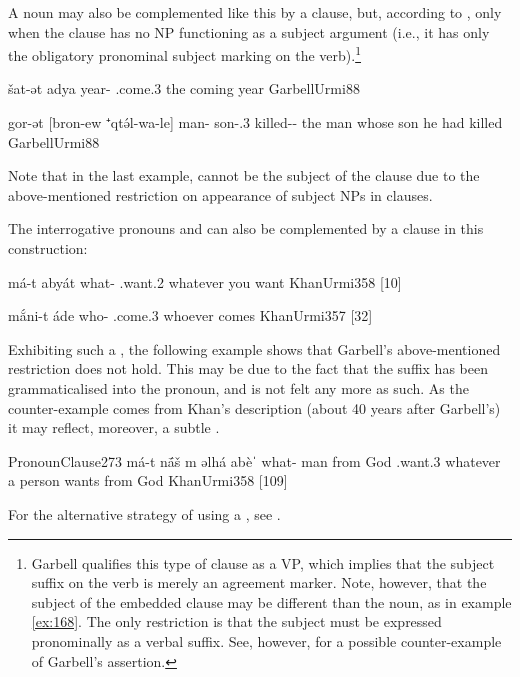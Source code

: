 A noun may also be complemented like this by a clause, but, according to \citet[88]{GarbellUrmi}, only when the clause has no NP functioning as a subject argument (i.e., it has only the obligatory pronominal subject marking on the verb).\footnote{Garbell qualifies this type of clause as a VP, which implies that the subject suffix on the verb is merely an agreement marker. Note, however, that the subject of the embedded clause may be different than the \prim noun, as in example \vref{ex:168}. The only restriction is that the subject must be expressed pronominally as a verbal suffix. See, however,  for a possible counter-example of Garbell's assertion.} 

{šat-ət adya}
{year-\cst{} \sbjv.come.3\fem}
{the coming year}
{GarbellUrmi}{88}

{gor-ət [bron-ew ⁺qtə́l-wa-le]}
{man-\cst{} son-\poss.3\masc{} killed-\pst-\masc}
{the man whose son he had killed}
{GarbellUrmi}{88}

Note that in the last example,  cannot be the subject of the clause due to the above-mentioned restriction on appearance of subject NPs in \secn clauses.

The interrogative pronouns  and  can also be complemented by a clause in this construction:

{má-t abyát}
{what-\cst{} \sbjv.want.2\fem}
{whatever you want}
{KhanUrmi}{358 {[10]}}

{mắni-t áde}
{who-\cst{} \sbjv.come.3\masc}
{whoever comes}
{KhanUrmi}{357 {[32]}}

Exhibiting such a \prim, the following example shows that Garbell's above-mentioned restriction does not hold. This may be due to the fact that the \cst* suffix has been grammaticalised into the \prim pronoun, and is not felt any more as such. As the counter-example comes from Khan's description (about 40 years after Garbell's) it may reflect, moreover, a subtle .

\acex
{Pronoun}{Clause}{273}
{má-t nā́š m\cb{} əlhá abèˈ}
{what-\cst{} man from\cb{} God \sbjv.want.3\masc}
{whatever a person wants from God}
{KhanUrmi}{358 {[109]}}



For the alternative strategy of using a , see  .



